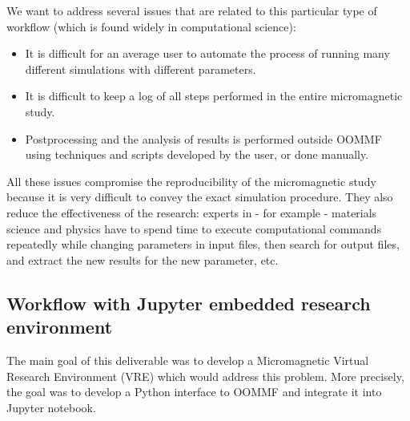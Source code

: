 \documentclass{deliverablereport}
\begin{document}
We want to address several issues that are related
to this particular type of workflow (which is found widely in
computational science):
\begin{itemize}
\item It is difficult for an average user to automate the process
of running many different simulations with different parameters.
\item It is difficult to keep a log of all steps performed in the
entire micromagnetic study.
\item Postprocessing and the analysis of results is performed outside
OOMMF using techniques and scripts developed by the user, or done manually.
\end{itemize}

All these issues compromise the reproducibility of the micromagnetic
study because it is very difficult to convey the exact simulation
procedure. They also reduce the effectiveness of the research: experts
in - for example - materials science and physics have to spend time to
execute computational commands repeatedly while changing parameters in
input files, then search for output files, and extract the new results
for the new parameter, etc.

\subsection{Workflow with Jupyter embedded research environment}

The main goal of this deliverable was
to develop a Micromagnetic Virtual Research Environment (VRE) which
would address this problem. More precisely, the goal was to develop a
Python interface to OOMMF and integrate it into Jupyter
notebook.
\end{document}
